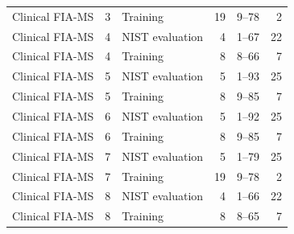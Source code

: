 \begin{longtable}{lllrrr}
Clinical FIA-MS & 3 & Training & 19 & 9--78 & 2 \\
Clinical FIA-MS & 4 & NIST evaluation & 4 & 1--67 & 22 \\
Clinical FIA-MS & 4 & Training & 8 & 8--66 & 7 \\
Clinical FIA-MS & 5 & NIST evaluation & 5 & 1--93 & 25 \\
Clinical FIA-MS & 5 & Training & 8 & 9--85 & 7 \\
Clinical FIA-MS & 6 & NIST evaluation & 5 & 1--92 & 25 \\
Clinical FIA-MS & 6 & Training & 8 & 9--85 & 7 \\
Clinical FIA-MS & 7 & NIST evaluation & 5 & 1--79 & 25 \\
Clinical FIA-MS & 7 & Training & 19 & 9--78 & 2 \\
Clinical FIA-MS & 8 & NIST evaluation & 4 & 1--66 & 22 \\
Clinical FIA-MS & 8 & Training & 8 & 8--65 & 7 \\
\end{longtable}

